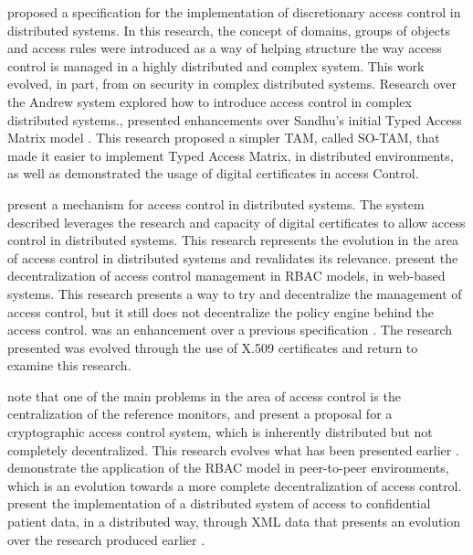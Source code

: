 \citeauthor{moffett_specifying_1990} proposed a specification for the implementation of discretionary
access control in distributed systems. In this research, the concept of domains, groups of objects and
access rules were introduced as a way of helping structure the way access control is managed in a highly
distributed and complex system. This work evolved, in part, from \citeauthor{satyanarayanan_integrating_1989} on security in complex distributed systems. Research over the Andrew system \cite{satyanarayanan_integrating_1989} explored how to introduce access control in complex distributed systems.\citeauthor{sandhu_implementation_1992}, presented enhancements over Sandhu’s initial Typed Access Matrix model \cite{sandhu_typed_1992}. This research proposed a simpler TAM, called SO-TAM, that made it easier to implement Typed Access Matrix, in distributed environments, as well as demonstrated the usage of digital certificates in access Control.

\citeauthor{johnston_authorization_1998} present a mechanism for access control in distributed
systems. The system described leverages the research and capacity of digital certificates to allow access
control in distributed systems. This research represents the evolution in the area of access control in
distributed systems and revalidates its relevance. \citeauthor{sandhu_decentralized_1998} present the decentralization of access control management in RBAC models, in web-based systems. This research presents a way to try and decentralize the management of access control, but it still does not decentralize the policy engine behind the access control. \citeauthor{sandhu_decentralized_1998} was an enhancement over a previous specification \cite{barkley_role_1997}. The research presented \cite{sandhu_decentralized_1998} was evolved through the use of X.509 certificates \cite{park_smart_1999} and \citeauthor{park_role-based_2001} return to examine this research.

\citeauthor{harrington_cryptographic_2003} note that one of the main problems in the area of access control is the centralization of the reference monitors, and present a proposal for a cryptographic access control system, which is inherently distributed but not completely decentralized. This research evolves what has been presented earlier \cite{satyanarayanan_integrating_1989}. \citeauthor{park_role-based_2003} demonstrate the application of the RBAC model in peer-to-peer environments, which is an evolution towards a more complete decentralization of access control. \citeauthor{abiteboul_electronic_2004} present the implementation of a distributed system of access to confidential patient data, in a distributed way, through XML data that presents an evolution over the research produced earlier \cite{damiani_fine-grained_2002}.

